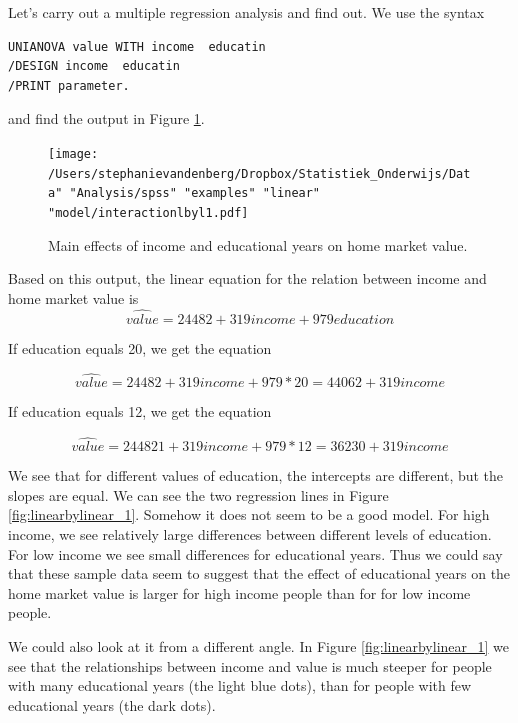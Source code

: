 \documentclass[]{book}\usepackage[]{graphicx}\usepackage[]{color}
\begin{document}
Let's carry out a multiple regression analysis and find out. We use the syntax

\begin{verbatim}
UNIANOVA value WITH income  educatin
/DESIGN income  educatin 
/PRINT parameter.
\end{verbatim}

and find the output in Figure \ref{fig:interactionlbyl1}. 

\begin{figure}[h]
    \begin{center}
       \texttt{[image: /Users/stephanievandenberg/Dropbox/Statistiek\_Onderwijs/Data" "Analysis/spss" "examples"  "linear" "model/interactionlbyl1.pdf]}
    \end{center}
    \label{fig:interactionlbyl1}
    \caption{Main effects of income and educational years on home market value.}
\end{figure}

Based on this output, the linear equation for the relation between income and home market value is 
\begin{equation}
\widehat{value}= 24482 + 319 income + 979 education
\end{equation}

If education equals 20, we get the equation

\begin{equation}
\widehat{value}= 24482 + 319 income + 979 * 20 = 44062 + 319 income
\end{equation}

If education equals 12, we get the equation 

\begin{equation}
\widehat{value}= 244821 + 319 income + 979 * 12 = 36230 + 319 income
\end{equation}

We see that for different values of education, the intercepts are different, but the slopes are equal. We can see the two regression lines in Figure \ref{fig:linearbylinear_1}. Somehow it does not seem to be a good model. For high income, we see relatively large differences between different levels of education. For low income we see small differences for educational years. Thus we could say that these sample data seem to suggest that the effect of educational years on the home market value is larger for high income people than for for low income people.

We could also look at it from a different angle. In Figure \ref{fig:linearbylinear_1} we see that the relationships between income and value is much steeper for people with many educational years (the light blue dots), than for people with few educational years (the dark dots).
\end{document}
